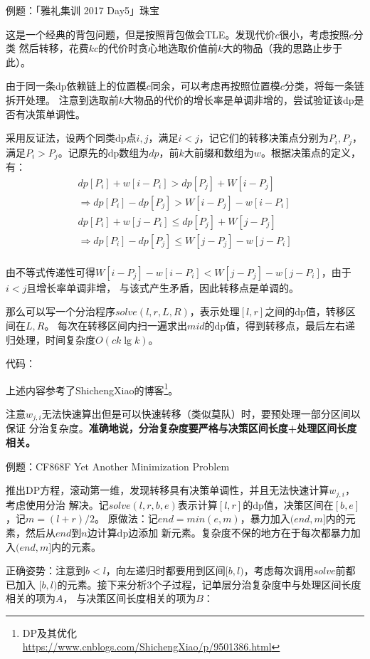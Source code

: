 例题：「雅礼集训 2017 Day5」珠宝

这是一个经典的背包问题，但是按照背包做会TLE。发现代价$c$很小，考虑按照$c$分类
然后转移，花费$kc$的代价时贪心地选取价值前$k$大的物品（我的思路止步于此）。

由于同一条dp依赖链上的位置模$c$同余，可以考虑再按照位置模$c$分类，将每一条链拆开处理。
注意到选取前$k$大物品的代价的增长率是单调非增的，尝试验证该dp是否有决策单调性。

采用反证法，设两个同类dp点$i,j$，满足$i<j$，记它们的转移决策点分别为$P_i,P_j$，
满足$P_i>P_j$。记原先的dp数组为$dp$，前$k$大前缀和数组为$w$。根据决策点的定义，有：
\begin{eqnarray*}
    dp[P_i]+w[i-P_i]>dp[P_j]+W[i-P_j]\\
    \Rightarrow dp[P_i]-dp[P_j]>W[i-P_j]-w[i-P_i]\\
    dp[P_i]+w[j-P_i]\leq dp[P_j]+W[j-P_j]\\
    \Rightarrow dp[P_i]-dp[P_j]\leq W[j-P_j]-w[j-P_i]\\
\end{eqnarray*}

由不等式传递性可得$W[i-P_j]-w[i-P_i]<W[j-P_j]-w[j-P_i]$，由于$i<j$且增长率单调非增，
与该式产生矛盾，因此转移点是单调的。

那么可以写一个分治程序$solve(l,r,L,R)$，表示处理$[l,r]$之间的dp值，转移区间在$L,R$。
每次在转移区间内扫一遍求出$mid$的dp值，得到转移点，最后左右递归处理，时间复杂度$O(ck\lg k)$。

代码：


上述内容参考了ShichengXiao的博客\footnote{
    DP及其优化\\
    \url{https://www.cnblogs.com/ShichengXiao/p/9501386.html}
}。

注意$w_{j,i}$无法快速算出但是可以快速转移（类似莫队）时，要预处理一部分区间以保证
分治复杂度。{\bfseries 准确地说，分治复杂度要严格与决策区间长度+处理区间长度相关。}

例题：CF868F Yet Another Minimization Problem

推出DP方程，滚动第一维，发现转移具有决策单调性，并且无法快速计算$w_{j,i}$，考虑使用分治
解决。记$solve(l,r,b,e)$表示计算$[l,r]$的dp值，决策区间在$[b,e]$，记$m=(l+r)/2$。
原做法：记$end=min(e,m)$，暴力加入$(end,m]$内的元素，然后从$end$到$n$边计算dp边添加
新元素。复杂度不保的地方在于每次都暴力加入$(end,m]$内的元素。

正确姿势：注意到$b<l$，向左递归时都要用到区间$[b,l)$，考虑每次调用$solve$前都已加入
$[b,l)$的元素。接下来分析3个子过程，记单层分治复杂度中与处理区间长度相关的项为$A$，
与决策区间长度相关的项为$B$：

